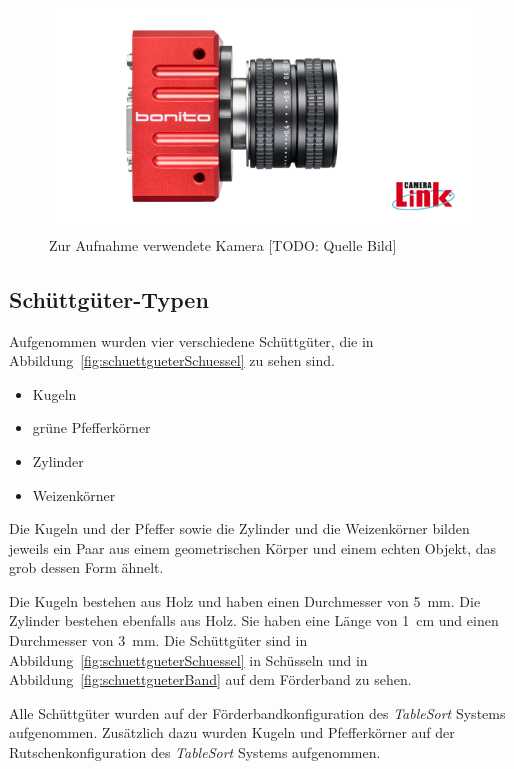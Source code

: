 \begin{figure}[h]
    \centering
    \includegraphics[width=\textwidth]{img/banner-Bonito_cropped}
    \caption{Zur Aufnahme verwendete Kamera [TODO: Quelle Bild]}
    \label{pictureCam}
\end{figure}

\subsection{Schüttgüter-Typen}

Aufgenommen wurden vier verschiedene Schüttgüter, die in Abbildung~\ref{fig:schuettgueterSchuessel} zu sehen sind.

\begin{itemize}
    \item Kugeln
    \item grüne Pfefferkörner
    \item Zylinder
    \item Weizenkörner
\end{itemize}

Die Kugeln und der Pfeffer sowie die Zylinder und die Weizenkörner bilden jeweils 
ein Paar aus einem geometrischen Körper und einem echten Objekt, das grob dessen Form ähnelt.

Die Kugeln bestehen aus Holz und haben einen Durchmesser von \SI{5}{\milli\metre}.
Die Zylinder bestehen ebenfalls aus Holz. Sie haben eine Länge von \SI{1}{\centi\metre} und einen Durchmesser von \SI{3}{\milli\metre}.
Die Schüttgüter sind in Abbildung~\ref{fig:schuettgueterSchuessel} in Schüsseln 
und in Abbildung~\ref{fig:schuettgueterBand} auf dem Förderband zu sehen.

Alle Schüttgüter wurden auf der Förderbandkonfiguration des \textit{TableSort} Systems aufgenommen.
Zusätzlich dazu wurden Kugeln und Pfefferkörner auf der Rutschenkonfiguration des \textit{TableSort} Systems aufgenommen.

